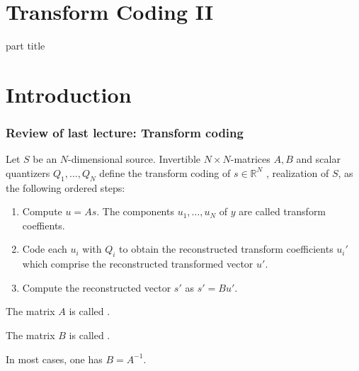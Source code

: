 
\DeclareMathOperator{\cwd}{codeword}
\newtheorem{proposition}{Proposition}
\usepackage{forest}
\usepackage{lipsum}
\usepackage{subcaption}
\usepackage{mathtools}
\DeclareMathOperator{\dist}{dist}
\DeclareMathOperator{\dimension}{dim}
\DeclareMathOperator{\gradient}{grad}

\section{Transform Coding II} 
\begin{frame}
 \vspace{12.0ex}
\begin{center}
\begin{beamercolorbox}[sep=12pt,center]{part title}
\insertsection\par
\end{beamercolorbox}
\end{center}
\end{frame}
\section{Introduction}
\begin{frame}\frametitle{Review of last lecture: Transform coding}
\begin{definition}
Let $S$ be an $N$-dimensional source. Invertible $N\times N$-matrices $A, B$ and scalar quantizers $Q_1,\dots,Q_N$ 
define the transform coding of $s\in\mathbb{R}^N$ , realization of $S$, as the following ordered steps:
\begin{enumerate}
\item Compute $u=As$. The components $u_1,\dots,u_N$ of $y$ are called transform coeffients. 
\item Code each $u_i$ with $Q_i$ to obtain the reconstructed transform coefficients $u_i'$ which comprise the reconstructed transformed vector $u'$. 
\item Compute the reconstructed vector $s'$ as $s'=Bu'$.   
\end{enumerate}
\end{definition}
\bit
\item The matrix $A$ is called .
\item The matrix $B$ is called . 
\item In most cases, one has $B=A^{-1}$. 
\eit
\end{frame}


